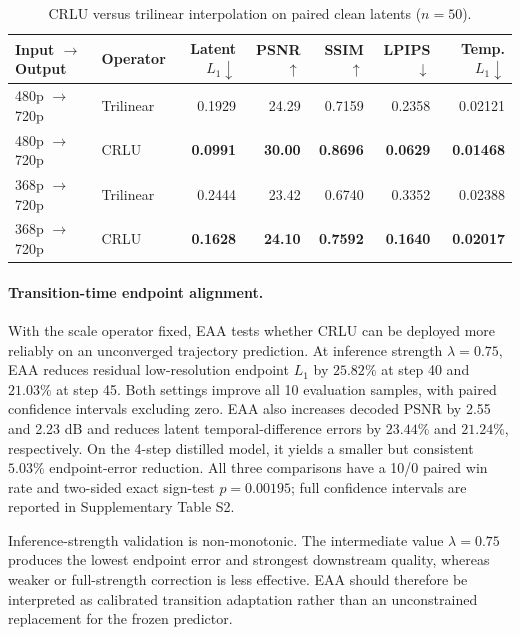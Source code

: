 \begin{table}[!t]
\centering
\footnotesize
\setlength{\tabcolsep}{5pt}
\begin{tabular}{llrrrrr}
\toprule
Input $\rightarrow$ Output & Operator & Latent $L_1\downarrow$ &
PSNR $\uparrow$ & SSIM $\uparrow$ & LPIPS $\downarrow$ &
Temp. $L_1\downarrow$ \\
\midrule
480p $\rightarrow$ 720p & Trilinear & 0.1929 & 24.29 & 0.7159 &
0.2358 & 0.02121 \\
480p $\rightarrow$ 720p & CRLU & \textbf{0.0991} & \textbf{30.00} &
\textbf{0.8696} & \textbf{0.0629} & \textbf{0.01468} \\
368p $\rightarrow$ 720p & Trilinear & 0.2444 & 23.42 & 0.6740 &
0.3352 & 0.02388 \\
368p $\rightarrow$ 720p & CRLU & \textbf{0.1628} & \textbf{24.10} &
\textbf{0.7592} & \textbf{0.1640} & \textbf{0.02017} \\
\bottomrule
\end{tabular}
\caption{CRLU versus trilinear interpolation on paired clean latents
(\(n=50\)).}
\label{tab:operator}
\end{table}

\paragraph{Transition-time endpoint alignment.}
With the scale operator fixed, EAA tests whether CRLU can be deployed more
reliably on an unconverged trajectory prediction. At inference strength
\(\lambda=0.75\), EAA reduces residual low-resolution endpoint \(L_1\) by \(25.82\%\) at
step 40 and \(21.03\%\) at step 45. Both settings improve all 10 evaluation
samples, with paired confidence intervals excluding zero. EAA also increases
decoded PSNR by 2.55 and 2.23 dB and reduces latent temporal-difference errors
by \(23.44\%\) and \(21.24\%\), respectively. On the 4-step distilled model,
it yields a smaller but consistent \(5.03\%\) endpoint-error reduction. All
three comparisons have a 10/0 paired win rate and two-sided exact sign-test
\(p=0.00195\); full confidence intervals are reported in Supplementary Table
S2.

Inference-strength validation is non-monotonic. The intermediate value
\(\lambda=0.75\) produces the lowest endpoint error and strongest downstream quality,
whereas weaker or full-strength correction is less effective. EAA should
therefore be interpreted as calibrated transition adaptation rather than an
unconstrained replacement for the frozen predictor.


